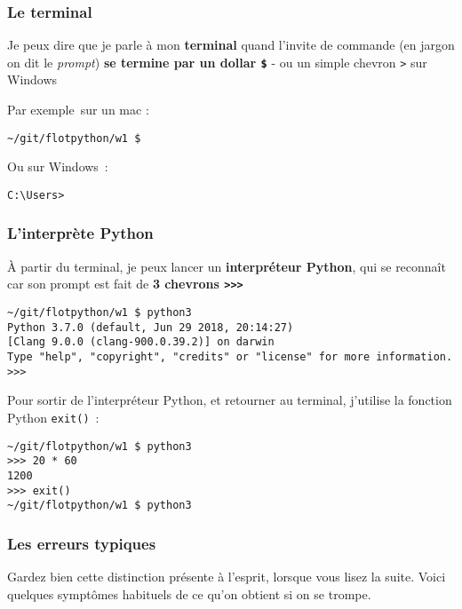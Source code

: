     \hypertarget{le-terminal}{%
\subsubsection{Le terminal}\label{le-terminal}}

Je peux dire que je parle à mon \textbf{terminal} quand l'invite de
commande (en jargon on dit le \emph{prompt}) \textbf{se termine par un
dollar \texttt{\$}} - ou un simple chevron \texttt{\textgreater{}} sur
Windows

Par exemple~sur un mac :

\begin{verbatim}
~/git/flotpython/w1 $ 
\end{verbatim}

Ou sur Windows~:

\begin{verbatim}
C:\Users>        
\end{verbatim}

    \hypertarget{linterpruxe8te-python}{%
\subsubsection{L'interprète Python}\label{linterpruxe8te-python}}

À partir du terminal, je peux lancer un \textbf{interpréteur Python},
qui se reconnaît car son prompt est fait de \textbf{3 chevrons
\texttt{\textgreater{}\textgreater{}\textgreater{}}}

\begin{verbatim}
~/git/flotpython/w1 $ python3
Python 3.7.0 (default, Jun 29 2018, 20:14:27)
[Clang 9.0.0 (clang-900.0.39.2)] on darwin
Type "help", "copyright", "credits" or "license" for more information.
>>>
\end{verbatim}

    Pour sortir de l'interpréteur Python, et retourner au terminal,
j'utilise la fonction Python \texttt{exit()}~:

\begin{verbatim}
~/git/flotpython/w1 $ python3
>>> 20 * 60
1200
>>> exit()
~/git/flotpython/w1 $ python3
\end{verbatim}

    \hypertarget{les-erreurs-typiques}{%
\subsubsection{Les erreurs typiques}\label{les-erreurs-typiques}}

Gardez bien cette distinction présente à l'esprit, lorsque vous lisez la
suite. Voici quelques symptômes habituels de ce qu'on obtient si on se
trompe.

